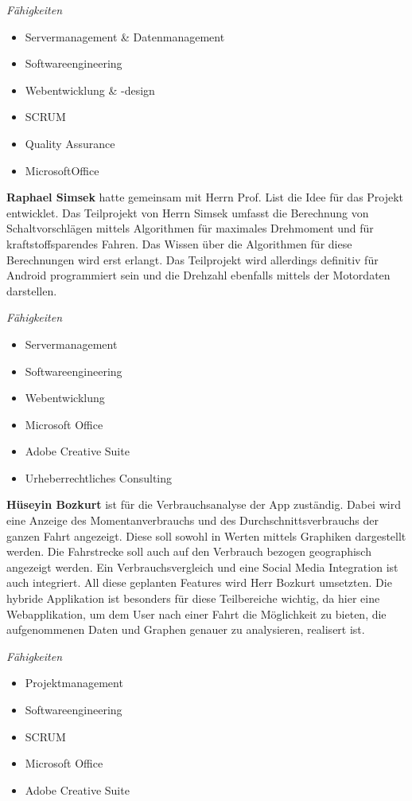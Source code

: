 \textit{Fähigkeiten}
\begin{itemize}
	\item Servermanagement & Datenmanagement				
	\item Softwareengineering
	\item Webentwicklung & -design
	\item SCRUM
	\item Quality Assurance
	\item MicrosoftOffice
\end{itemize}

\newpage

\textbf{Raphael Simsek} hatte gemeinsam mit Herrn Prof. List die Idee für das Projekt entwicklet. Das Teilprojekt von Herrn Simsek umfasst die Berechnung von Schaltvorschlägen mittels Algorithmen für maximales Drehmoment und für kraftstoffsparendes Fahren. Das Wissen über die Algorithmen für diese Berechnungen wird erst erlangt. Das Teilprojekt wird allerdings definitiv für Android programmiert sein und die Drehzahl ebenfalls mittels der Motordaten darstellen.

\textit{Fähigkeiten}
\begin{itemize}
	\item Servermanagement				
	\item Softwareengineering
	\item Webentwicklung
	\item Microsoft Office
	\item Adobe Creative Suite
	\item Urheberrechtliches Consulting
\end{itemize}

\nextline

\textbf{Hüseyin Bozkurt} ist für die Verbrauchsanalyse der App zuständig. Dabei wird eine Anzeige des Momentanverbrauchs und des Durchschnittsverbrauchs der ganzen Fahrt angezeigt. Diese soll sowohl in Werten mittels Graphiken dargestellt werden. Die Fahrstrecke soll auch auf den Verbrauch bezogen geographisch angezeigt werden. Ein Verbrauchsvergleich und eine Social Media Integration ist auch integriert.
All diese geplanten Features wird Herr Bozkurt umsetzten. Die hybride Applikation ist besonders für diese Teilbereiche wichtig, da hier eine Webapplikation, um dem User nach einer Fahrt die Möglichkeit zu bieten, die aufgenommenen Daten und Graphen genauer zu analysieren, realisert ist.

\textit{Fähigkeiten}
\begin{itemize}
	\item Projektmanagement			
	\item Softwareengineering
	\item SCRUM
	\item Microsoft Office
	\item Adobe Creative Suite
\end{itemize}

